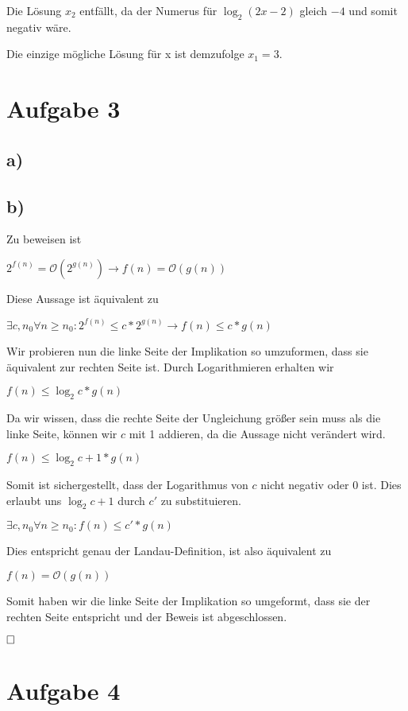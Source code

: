 \documentclass[12pt]{scrartcl}%
\theoremstyle{nonumberplain}
\newcommand{\bO}[1]{\mathcal O(#1)}
\begin{document}
Die Lösung $x_2$ entfällt, da der Numerus für $\log_{2}{(2x-2)}$ gleich $-4$ und somit negativ wäre.

Die einzige mögliche Lösung für x ist demzufolge $x_1 = 3$.

\newpage

\section*{Aufgabe 3}
\subsection*{a)}

\subsection*{b)}

Zu beweisen ist

$ 2^{f(n)} = \bO{2^{g(n)}} \rightarrow f(n) = \bO{g(n)} $

Diese Aussage ist äquivalent zu

$ \exists c,n_0 \forall n \ge n_0: 2^{f(n)} \le c * 2^{g(n)} \rightarrow f(n) \le c * g(n) $

Wir probieren nun die linke Seite der Implikation so umzuformen, dass sie äquivalent zur rechten Seite ist. Durch Logarithmieren erhalten wir

$ f(n) \le \log_{2}{c} * g(n) $

Da wir wissen, dass die rechte Seite der Ungleichung größer sein muss als die linke Seite, können wir $c$ mit 1 addieren, da die Aussage nicht verändert wird.

$ f(n) \le \log_{2}{c+1} * g(n) $

Somit ist sichergestellt, dass der Logarithmus von $c$ nicht negativ oder $0$ ist. Dies erlaubt uns $\log_{2}{c+1}$ durch $c'$ zu substituieren.

$ \exists c,n_0 \forall n \ge n_0: f(n) \le c' * g(n)$

Dies entspricht genau der Landau-Definition, ist also äquivalent zu

$ f(n) = \bO{g(n)}$

Somit haben wir die linke Seite der Implikation so umgeformt, dass sie der rechten Seite entspricht und der Beweis ist abgeschlossen.

$\hfill \square$

\newpage

\section*{Aufgabe 4}
\end{document}

